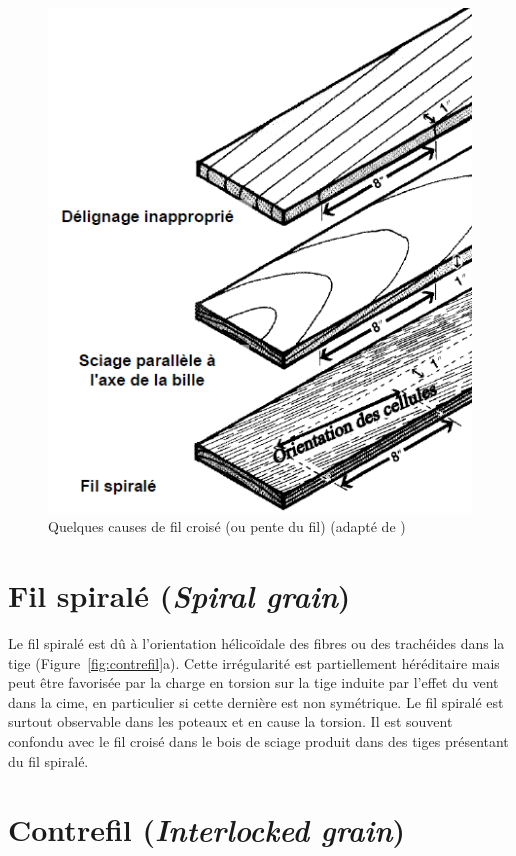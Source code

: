 \begin{figure}[h]
	\centering
	\includegraphics[scale=0.7]{img/ch9_fil}
	\caption{Quelques causes de fil croisé (ou pente du fil) (adapté de \cite{bowyer2007forest})}
	\label{fig:fil}
\end{figure}

\section{Fil spiralé (\textit{Spiral grain})}

Le fil spiralé est dû à l'orientation hélicoïdale des fibres ou des trachéides dans la tige (Figure~\ref{fig:contrefil}a). Cette irrégularité est partiellement héréditaire mais peut être favorisée par la charge en torsion sur la tige induite par l'effet du vent dans la cime, en particulier si cette dernière est non symétrique. Le fil spiralé est surtout observable dans les poteaux et en cause la torsion. Il est souvent confondu avec le fil croisé dans le bois de sciage produit dans des tiges présentant du fil spiralé.

\section{Contrefil (\textit{Interlocked grain})}

